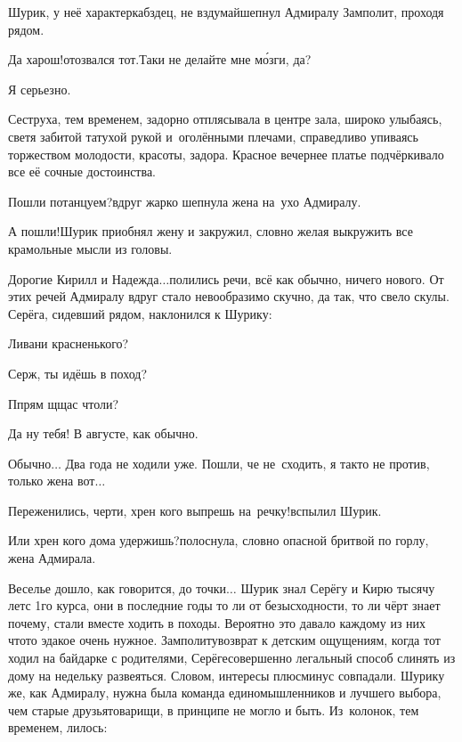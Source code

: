 {\diagdash Шурик, у неё характер\mdash кабздец, не вздумай\mdash шепнул Адмиралу Замполит, проходя рядом. 

\diagdash Да харош!\mdash отозвался тот.\mdash Таки не делайте мне м\'{о}зги, да?

\diagdash Я серьезно.

Сеструха, тем временем, задорно отплясывала в центре зала, широко улыбаясь, светя забитой татухой рукой и~оголёнными плечами, справедливо упиваясь торжеством молодости, красоты, задора. Красное вечернее платье подчёркивало все её сочные достоинства.

\diagdash Пошли потанцуем?\mdash вдруг жарко шепнула жена на~ухо Адмиралу.

\diagdash А пошли!\mdash Шурик приобнял жену и закружил, словно желая выкружить все крамольные мысли из головы. 

\diagdash Дорогие Кирилл и Надежда$\ldots$\mdash полились речи, всё как обычно, ничего нового. От этих речей Адмиралу вдруг стало невообразимо скучно, да так, что свело скулы. Серёга, сидевший рядом, наклонился к Шурику:

\diagdash Ливани красненького?

\diagdash Серж, ты идёшь в поход? 

\diagdash П\sdash прям щ\sdash щас чтоли?

\diagdash Да ну тебя! В августе, как обычно.

\diagdash Обычно$\ldots$ Два года не ходили уже. Пошли, че не~сходить, я так\sdash то не против, только жена вот$\ldots$

\diagdash Переженились, черти, хрен кого выпрешь на~речку!\mdash вспылил Шурик.

\diagdash Или хрен кого дома удержишь?\mdash полоснула, словно опасной бритвой по горлу, жена Адмирала. 

Веселье дошло, как говорится, до точки$\ldots$ Шурик знал Серёгу и Кирю тысячу лет\mdash с 1\sdash го курса, они в последние годы то ли от безысходности, то ли чёрт знает почему, стали вместе ходить в походы. Вероятно это давало каждому из них что\sdash то эдакое очень нужное. Замполиту\mdash возврат к детским ощущениям, когда тот ходил на байдарке с родителями, Серёге\mdash совершенно легальный способ слинять из дому на недельку развеяться. Словом, интересы плюс\sdash минус совпадали. Шурику же, как Адмиралу, нужна была команда единомышленников и лучшего выбора, чем старые друзья\sdash товарищи, в принципе не могло и быть. Из~колонок, тем временем, лилось:

}
